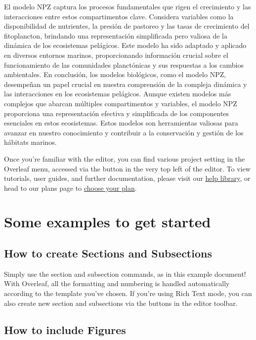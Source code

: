 \documentclass{article}
\begin{document}
El modelo NPZ captura los procesos fundamentales que rigen el crecimiento y las interacciones entre estos compartimentos clave. Considera variables como la disponibilidad de nutrientes, la presión de pastoreo y las tasas de crecimiento del fitoplancton, brindando una representación simplificada pero valiosa de la dinámica de los ecosistemas pelágicos. Este modelo ha sido adaptado y aplicado en diversos entornos marinos, proporcionando información crucial sobre el funcionamiento de las comunidades planctónicas y sus respuestas a los cambios ambientales.
En conclusión, los modelos biológicos, como el modelo NPZ, desempeñan un papel crucial en nuestra comprensión de la compleja dinámica y las interacciones en los ecosistemas pelágicos. Aunque existen modelos más complejos que abarcan múltiples compartimentos y variables, el modelo NPZ proporciona una representación efectiva y simplificada de los componentes esenciales en estos ecosistemas. Estos modelos son herramientas valiosas para avanzar en nuestro conocimiento y contribuir a la conservación y gestión de los hábitats marinos.


Once you're familiar with the editor, you can find various project setting in the Overleaf menu, accessed via the button in the very top left of the editor. To view tutorials, user guides, and further documentation, please visit our \href{https://www.overleaf.com/learn}{help library}, or head to our plans page to \href{https://www.overleaf.com/user/subscription/plans}{choose your plan}.

\section{Some examples to get started}

\subsection{How to create Sections and Subsections}

Simply use the section and subsection commands, as in this example document! With Overleaf, all the formatting and numbering is handled automatically according to the template you've chosen. If you're using Rich Text mode, you can also create new section and subsections via the buttons in the editor toolbar.

\subsection{How to include Figures}
\end{document}
